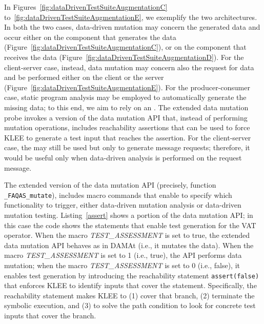 In Figures~\ref{fig:dataDrivenTestSuiteAugmentationC} to~\ref{fig:dataDrivenTestSuiteAugmentationE}, we exemplify the two architectures. In both the two cases, data-driven mutation may concern the generated data and occur either on the component that generates the data (Figure~\ref{fig:dataDrivenTestSuiteAugmentationC}), or on the component that receives the data (Figure~\ref{fig:dataDrivenTestSuiteAugmentationD}).
For the client-server case, instead, data mutation may concern also the request for data and be performed either on the client or the server (Figure~\ref{fig:dataDrivenTestSuiteAugmentationE}). For the producer-consumer case, static program analysis may be employed to automatically generate the missing data; to this end, we aim to rely on an . 
The extended data mutation probe invokes a version of the data mutation API that, instead of performing mutation operations, includes reachability assertions that can be used to force KLEE to generate a test input that reaches the assertion. 
For the client-server case, the  may still be used but only to generate message requests; therefore, it would be useful only when data-driven analysis is performed on the  request message. 

The extended version of the data mutation API (precisely, function \texttt{\_FAQAS\_mutate}), 
includes macro commands that enable to specify which functionality to trigger, either data-driven mutation analysis or data-driven mutation testing.
Listing~\ref{assert} shows a portion of the data mutation API; in this case the code shows the statements that enable test generation for the VAT operator. When the macro \emph{TEST\_ASSESSMENT} is set to true, the extended data mutation API behaves as in DAMAt (i.e., it mutates the data). When the macro \emph{TEST\_ASSESSMENT} is set to 1 (i.e., true), the API performs data mutation; 
when the macro \emph{TEST\_ASSESSMENT} is set to 0 (i.e., false), 
it enables test generation by introducing the reachability statement \texttt{assert(false)} that enforces KLEE to identify inputs that cover the statement.
Specifically, the reachability statement makes KLEE to (1) cover that branch, (2)  terminate the symbolic execution, and (3) to solve the path condition to look for concrete test inputs that cover the branch.


